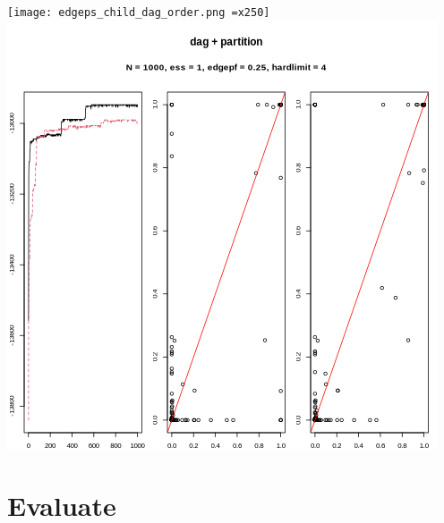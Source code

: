 \documentclass[
]{article}
\begin{document}
\texttt{[image: edgeps\_child\_dag\_order.png =x250]}
\includegraphics{edgeps_child_dag_partition.png}

\hypertarget{evaluate}{%
\section{Evaluate}\label{evaluate}}
\end{document}
